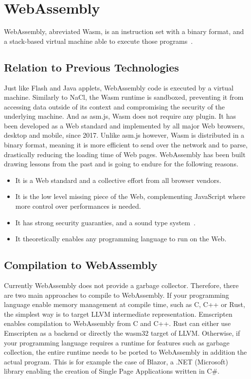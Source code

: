 \section{WebAssembly}%
\label{sec:WebAssembly}

WebAssembly, abreviated Wasm, is an instruction set with a binary format,
and a stack-based virtual machine able to execute those programs~\cite{haas2017bringing}.

\subsection{Relation to Previous Technologies}%
\label{sub:wasm_previous}

Just like Flash and Java applets, WebAssembly code
is executed by a virtual machine.
Similarly to NaCl, the Wasm runtime is sandboxed,
preventing it from accessing data outside of its context
and compromising the security of the underlying machine.
And as asm.js, Wasm does not require any plugin.
It has been developed as a Web standard and implemented
by all major Web browsers, desktop and mobile, since 2017.
Unlike asm.js however, Wasm is distributed in a binary format,
meaning it is more efficient to send over the network and to parse,
drastically reducing the loading time of Web pages.
WebAssembly has been built drawing lessons from the past and is going to endure
for the following reasons.

\begin{itemize}
	\item It is a Web standard and a collective effort from all browser vendors.
	\item It is the low level missing piece of the Web,
		complementing JavaScript where more control over performances is needed.
	\item It has strong security guaranties, and a sound type system~\cite{watt2018mechanising}.
	\item It theoretically enables any programming language to run on the Web.
\end{itemize}

\subsection{Compilation to WebAssembly}%
\label{sub:compile-wasm}

Currently WebAssembly does not provide a garbage collector.
Therefore, there are two main approaches to compile to WebAssembly.
If your programming language enable memory management at compile time,
such as C, C++ or Rust, the simplest way is to target LLVM intermediate representation.
Emscripten enables compilation to WebAssembly from C and C++.
Rust can either use Emscripten as a backend or directly the wasm32 target of LLVM.\@
Otherwise, if your programming language requires a runtime for features such as garbage collection,
the entire runtime needs to be ported to WebAssembly in addition the actual program.
This is for example the case of Blazor, a .NET (Microsoft) library
enabling the creation of Single Page Applications written in C\#.

